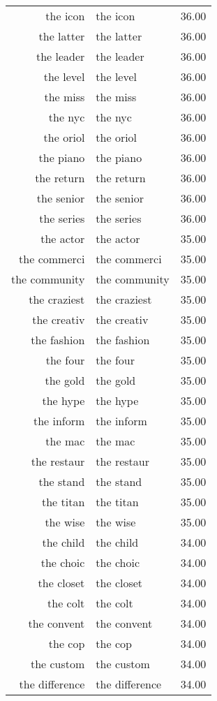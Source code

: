 \begin{table}[ht]
\begin{tabular}{rlr}
  the icon & the icon & 36.00 \\ 
  the latter & the latter & 36.00 \\ 
  the leader & the leader & 36.00 \\ 
  the level & the level & 36.00 \\ 
  the miss & the miss & 36.00 \\ 
  the nyc & the nyc & 36.00 \\ 
  the oriol & the oriol & 36.00 \\ 
  the piano & the piano & 36.00 \\ 
  the return & the return & 36.00 \\ 
  the senior & the senior & 36.00 \\ 
  the series & the series & 36.00 \\ 
  the actor & the actor & 35.00 \\ 
  the commerci & the commerci & 35.00 \\ 
  the community & the community & 35.00 \\ 
  the craziest & the craziest & 35.00 \\ 
  the creativ & the creativ & 35.00 \\ 
  the fashion & the fashion & 35.00 \\ 
  the four & the four & 35.00 \\ 
  the gold & the gold & 35.00 \\ 
  the hype & the hype & 35.00 \\ 
  the inform & the inform & 35.00 \\ 
  the mac & the mac & 35.00 \\ 
  the restaur & the restaur & 35.00 \\ 
  the stand & the stand & 35.00 \\ 
  the titan & the titan & 35.00 \\ 
  the wise & the wise & 35.00 \\ 
  the child & the child & 34.00 \\ 
  the choic & the choic & 34.00 \\ 
  the closet & the closet & 34.00 \\ 
  the colt & the colt & 34.00 \\ 
  the convent & the convent & 34.00 \\ 
  the cop & the cop & 34.00 \\ 
  the custom & the custom & 34.00 \\ 
  the difference & the difference & 34.00 \\ 

\end{tabular}
\end{table}

